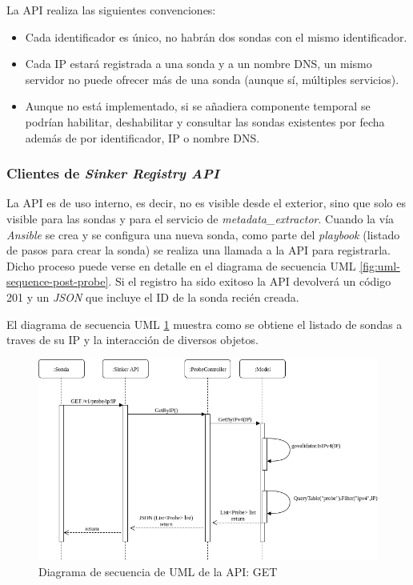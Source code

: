 La API realiza las siguientes convenciones:

\begin{itemize}
    \item Cada identificador es único, no habrán dos sondas con el mismo identificador.
    \item Cada IP estará registrada a una sonda y a un nombre DNS, un mismo servidor no puede ofrecer más de una sonda (aunque sí, múltiples servicios).
    \item Aunque no está implementado, si se añadiera componente temporal se podrían habilitar, deshabilitar y consultar las sondas existentes por fecha además
    de por identificador, IP o nombre DNS.
\end{itemize}

\subsubsection{Clientes de \emph{Sinker Registry API}}

La API es de uso interno, es decir, no es visible desde el exterior, sino que solo es visible para las sondas y para el servicio de \emph{metadata\_extractor}.
Cuando la vía \emph{Ansible} se crea y se configura una nueva sonda, como parte del \emph{playbook} (listado de pasos para crear la sonda) se
realiza una llamada a la API para registrarla. Dicho proceso puede verse en detalle en el diagrama de secuencia UML \ref{fig:uml-sequence-post-probe}.
Si el registro ha sido exitoso la API devolverá un código 201 y un \emph{JSON} que incluye el ID de la sonda recién creada.

El diagrama de secuencia UML \ref{fig:uml-sequence-get-probe} muestra como se obtiene el listado de sondas a traves de su IP y la interacción
de diversos objetos.

\begin{figure}[htp]
    \centering
      \includegraphics[scale=0.6]{images/UMLSequenceGetProbe}
    \caption{Diagrama de secuencia de UML de la API: GET}
    \label{fig:uml-sequence-get-probe}
\end{figure}

